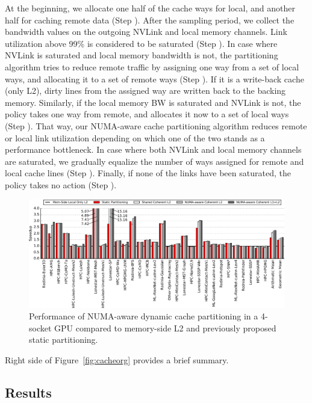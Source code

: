 At the beginning, we allocate one half of the cache ways for local, and another half for caching 
remote data (Step ). After the sampling period, we collect the 
bandwidth values on the outgoing NVLink and local memory channels. Link 
utilization above 99\% is considered to be saturated (Step ). 
In case where NVLink is saturated and local memory bandwidth is not, the 
partitioning algorithm tries to reduce remote traffic by assigning one way 
from a set of local ways, and allocating it to a set of remote ways 
(Step ). If it is a write-back cache (only L2), dirty lines from the 
assigned way are written back to the backing memory. Similarly, if the local 
memory BW is saturated and NVLink is not, the policy takes one way from 
remote, and allocates it now to a set of local ways (Step ). That way, our NUMA-aware cache partitioning algorithm reduces 
remote or local link utilization depending on which one of the two stands as 
a performance bottleneck. In case where both NVLink and local memory channels 
are saturated, we gradually equalize the number of ways assigned for remote 
and local cache lines (Step ). Finally, if none of the links have 
been saturated, the policy takes no action (Step ).

\begin{figure}[t]
    \centering
    \includegraphics[width=1.0\textwidth]{figures/plot_merged_cache_WB.pdf}
    \caption{Performance of NUMA-aware dynamic cache partitioning in a 4-socket GPU compared to memory-side L2 and previously proposed static partitioning.}
    \label{fig:dynamiccaching}
\end{figure}

Right side of Figure~\ref{fig:cacheorg} provides a brief summary.  


\subsection{Results}

